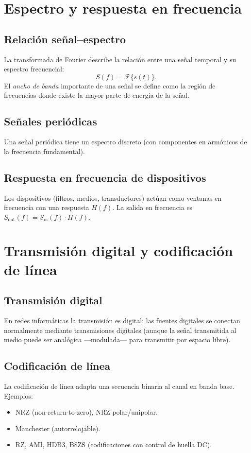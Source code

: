 \documentclass[11pt,a4paper]{article}
\begin{document}
\section{Espectro y respuesta en frecuencia}
\subsection{Relación señal--espectro}
La transformada de Fourier describe la relación entre una señal temporal y su espectro frecuencial:
\[
S(f) = \mathcal{F}\{s(t)\}.
\]
El \emph{ancho de banda} importante de una señal se define como la región de frecuencias donde existe la mayor parte de energía de la señal.

\subsection{Señales periódicas}
Una señal periódica tiene un espectro discreto (con componentes en armónicos de la frecuencia fundamental).

\subsection{Respuesta en frecuencia de dispositivos}
Los dispositivos (filtros, medios, transductores) actúan como ventanas en frecuencia con una respuesta $H(f)$. La salida en frecuencia es $S_\text{out}(f) = S_\text{in}(f)\cdot H(f)$.

\section{Transmisión digital y codificación de línea}
\subsection{Transmisión digital}
En redes informáticas la transmisión es digital: las fuentes digitales se conectan normalmente mediante transmisiones digitales (aunque la señal transmitida al medio puede ser analógica —modulada— para transmitir por espacio libre).

\subsection{Codificación de línea}
La codificación de línea adapta una secuencia binaria al canal en banda base. Ejemplos:
\begin{itemize}
  \item NRZ (non-return-to-zero), NRZ polar/unipolar.
  \item Manchester (autorrelojable).
  \item RZ, AMI, HDB3, B8ZS (codificaciones con control de huella DC).
\end{itemize}
\end{document}
